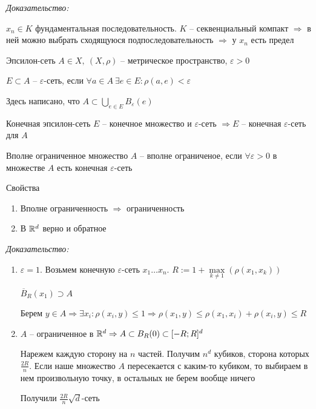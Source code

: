 \documentclass[12pt]{article}
\begin{document}
\textit{Доказательство:}

$x_n \in K$ фундаментальная последовательность. $K$ -- секвенциальный компакт $\Rightarrow$ в ней можно выбрать сходящуюся подпоследовательность $\Rightarrow$ у $x_n$ есть предел 

\begin{defin}{Эпсилон-сеть}
    $A \in X,\ (X, \rho)$ -- метрическое пространство, $\varepsilon > 0$

    $E \subset A$ -- $\varepsilon$-сеть, если $\forall a \in A\ \exists e \in E : \rho(a, e) < \varepsilon$
\end{defin}

\begin{Remark}{}
    Здесь написано, что $A \subset \bigcup\limits_{e \in E} B_\varepsilon(e)$
\end{Remark}

\begin{defin}{Конечная эпсилон-сеть}
    $E$ -- конечное множество и $\varepsilon$-сеть $\Rightarrow E$ -- конечная $\varepsilon$-сеть для $A$
\end{defin}

\begin{defin}{Вполне ограниченное множество}
    $A$ -- вполне ограниченое, если $\forall \varepsilon > 0$ в множестве $A$ есть конечная $\varepsilon$-сеть
\end{defin}

\begin{theo}{Свойства}
    \begin{enumerate}
        \item Вполне ограниченность $\Rightarrow$ ограниченность 
        \item В $\mathbb R^d$ верно и обратное
    \end{enumerate}
\end{theo}

\textit{Доказательство:}

\begin{enumerate}
    \item $\varepsilon = 1$. Возьмем конечную $\varepsilon$-сеть $x_1 \ldots x_n$. $R := 1 + \max\limits_{k \neq 1}(\rho(x_1, x_k))$
    
    $\overline{B}_R(x_1) \supset A$

    Берем $y \in A \Rightarrow \exists x_i  : \rho(x_i, y) \leq 1 \Rightarrow \rho(x_1, y) \leq \rho(x_1, x_i) + \rho(x_i, y) \leq R$

    \item $A$ -- ограниченное в $\mathbb R^d \Rightarrow A \subset B_R(0) \subset [-R; R]^d$
    
    Нарежем каждую сторону на $n$ частей. Получим $n^d$ кубиков, сторона которых $\frac{2R}{n}$. Если наше множество $A$ пересекается с каким-то кубиком, то выбираем в нем произвольную точку, в остальных не берем вообще ничего

    Получили $\frac{2R}{n}\sqrt{d}$-сеть
\end{enumerate}
\end{document}
